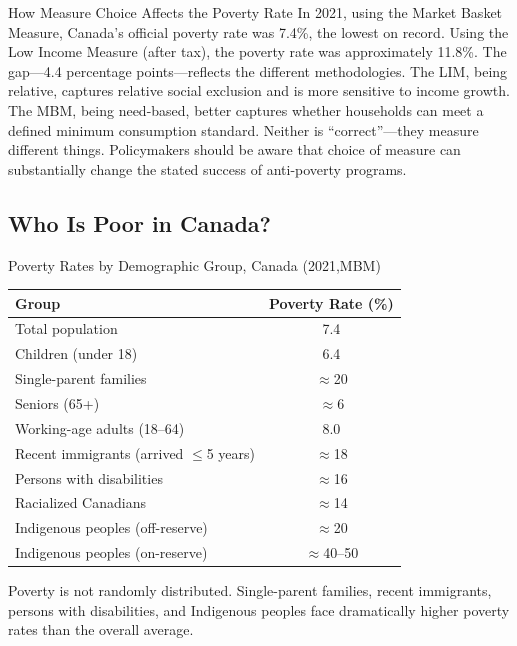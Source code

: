 \begin{canexample}{How Measure Choice Affects the Poverty Rate}
In 2021, using the Market Basket Measure, Canada's official poverty rate was 7.4\%,
the lowest on record. Using the Low Income Measure (after tax), the poverty rate
was approximately 11.8\%. The gap---4.4 percentage points---reflects the different
methodologies. The LIM, being relative, captures relative social exclusion and is
more sensitive to income growth. The MBM, being need-based, better captures
whether households can meet a defined minimum consumption standard.
Neither is ``correct''---they measure different things. Policymakers should be aware
that choice of measure can substantially change the stated success of anti-poverty programs.
\end{canexample}

\subsection{Who Is Poor in Canada?}

\begin{databox}{Poverty Rates by Demographic Group, Canada (2021,MBM)}
\begin{center}
\begin{tabular}{lc}
\toprule
\textbf{Group} & \textbf{Poverty Rate (\%)} \\
\midrule
Total population & 7.4 \\
Children (under 18) & 6.4 \\
Single-parent families & $\approx$20 \\
Seniors (65+) & $\approx$6 \\
Working-age adults (18--64) & 8.0 \\
Recent immigrants (arrived $\leq$5 years) & $\approx$18 \\
Persons with disabilities & $\approx$16 \\
Racialized Canadians & $\approx$14 \\
Indigenous peoples (off-reserve) & $\approx$20 \\
Indigenous peoples (on-reserve) & $\approx$40--50 \\
\bottomrule
\end{tabular}
\end{center}
Poverty is not randomly distributed. Single-parent families, recent immigrants, persons with
disabilities, and Indigenous peoples face dramatically higher poverty rates than the overall average.
\end{databox}

